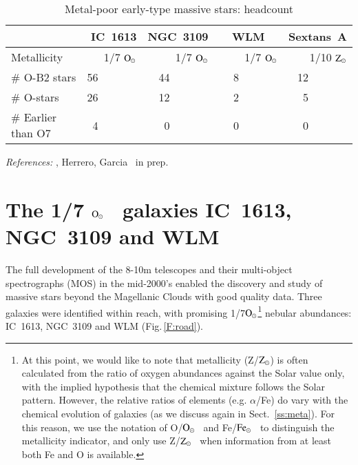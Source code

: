 \documentclass{iau}
\newcommand{\Osun}{$\rm O_{\odot}$}
\newcommand{\Fesun}{$\rm Fe_{\odot}$}
\newcommand{\Zsun}{$\rm Z_{\odot}$}
\begin{document}
\begin{table}[t]
  \begin{center}
  \caption{Metal-poor early-type massive stars: headcount}
  \label{T:census}
 {\scriptsize
  \begin{tabular}{|l|r r r r|}\hline 
{\bf       }   & {\bf IC~1613} & {\bf NGC~3109} & {\bf ~~WLM~~}   & {\bf Sextans~A} \\  \hline
Metallicity    & 1/7 \Osun     & 1/7 \Osun      & 1/7 \Osun       & 1/10 \Zsun      \\
\# O-B2 stars  & 56~~~~~~~     & 44~~~~~~~      & 8~~~~~~~        & 12~~~~~~~       \\
\# O-stars     & 26~~~~~~~     & 12~~~~~~~      & 2~~~~~~~        &  5~~~~~~~       \\
\# Earlier than O7 &  4~~~~~~~     &  0~~~~~~~      & 0~~~~~~~        &  0~~~~~~~       \\  \hline
  \end{tabular}
  }
 \end{center}
\vspace{1mm}
 \scriptsize{
   {\it References:}
   \citet{ALM88,Lal02,Bal06,Bal07,Eal07,GH13a,Cal16}, Herrero, Garcia \etal\ in prep.
  }
\end{table}


\section{The 1/7 \Osun~ galaxies IC~1613, NGC~3109 and WLM}
\label{s:ic1613}

The full development of the 8-10m telescopes and their multi-object spectrographs (MOS) in the
mid-2000's enabled the discovery and study of massive stars beyond the Magellanic Clouds with good quality data.
Three galaxies were identified within reach,
with promising 1/7\Osun\footnote{
At this point, we would like to note that metallicity (Z/\Zsun)
is often calculated from the ratio of oxygen abundances against the Solar value only,
with the implied hypothesis that the chemical mixture follows the Solar pattern.
However, the relative ratios of elements (e.g. $\alpha$/Fe) do vary with the chemical evolution of galaxies (as we discuss again in 
Sect.~\ref{ss:meta}).
For this reason, we use the notation of O/\Osun~ and Fe/\Fesun~ to distinguish the metallicity
indicator, and only use Z/\Zsun~ when information from at least both Fe and O is available.
  }
nebular abundances: IC~1613, NGC~3109 and WLM
(Fig.\,\ref{F:road}).
\end{document}
